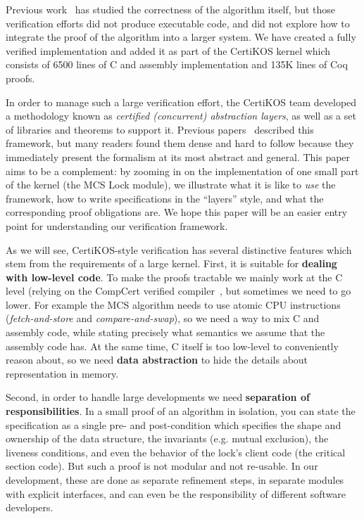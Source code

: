 {Previous work~\cite{lili16,ogata:mcs-lock} has studied the
correctness of the algorithm itself, but those verification efforts
did not produce executable code, and did not explore how to integrate
the proof of the algorithm into a larger system. We have created a
fully verified implementation and added it as part of the CertiKOS
kernel  which consists of 6500 lines of C and
assembly implementation and 135K lines of Coq proofs.

In order to manage such a large verification effort, the CertiKOS team developed a methodology known as \emph{certified (concurrent) abstraction layers}, as well as a set of libraries and theorems to support it. Previous papers~\cite{deepspec}
described this framework, but many readers found them  dense and hard to follow because they immediately present the formalism at its most abstract and general.
This paper aims to be a complement: by zooming in on the implementation of one small part of the kernel (the MCS Lock module), we illustrate  what it is like to \emph{use} the framework, how to write specifications in the ``layers'' style, and what the corresponding proof obligations are. We hope this paper will be an easier entry point for understanding our verification framework.

As we will see, CertiKOS-style verification has several distinctive features which stem from the requirements of a large kernel. First, it is suitable for {\bf dealing with low-level code}. To make the proofs tractable we mainly work at the C level (relying on the CompCert verified compiler~\cite{compcert}, but sometimes we need to go lower. For example the MCS algorithm needs to use atomic CPU instructions ({\em fetch-and-store} and {\em compare-and-swap}), so we need a way to  mix C and assembly code, while stating precisely what semantics we assume that the assembly code has. At the same time, C itself is too low-level to conveniently reason about, so we need {\bf data abstraction} to hide the details about representation in memory.

Second, in order to handle large developments we need {\bf separation of responsibilities}. In a small proof of an algorithm in isolation, you can state the specification as a single pre- and post-condition which specifies the shape and ownership of the data structure, the invariants (e.g. mutual exclusion), the liveness conditions, and even the behavior of the lock's client code (the critical section code). But such a proof is not modular and not re-usable. In our development, these are done as separate refinement steps, in separate modules with explicit interfaces, and can even be the responsibility of different software developers. 

}
